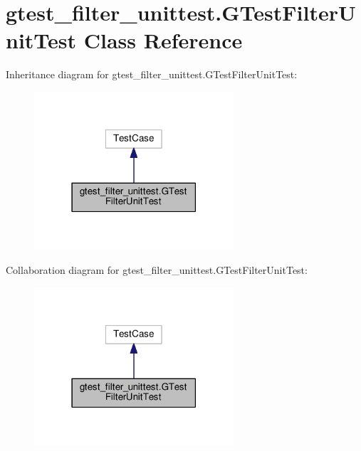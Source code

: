 \hypertarget{classgtest__filter__unittest_1_1GTestFilterUnitTest}{}\section{gtest\+\_\+filter\+\_\+unittest.\+G\+Test\+Filter\+Unit\+Test Class Reference}
\label{classgtest__filter__unittest_1_1GTestFilterUnitTest}


Inheritance diagram for gtest\+\_\+filter\+\_\+unittest.\+G\+Test\+Filter\+Unit\+Test\+:
\nopagebreak
\begin{figure}[H]
\begin{center}
\leavevmode
\includegraphics[width=210pt]{classgtest__filter__unittest_1_1GTestFilterUnitTest__inherit__graph}
\end{center}
\end{figure}


Collaboration diagram for gtest\+\_\+filter\+\_\+unittest.\+G\+Test\+Filter\+Unit\+Test\+:
\nopagebreak
\begin{figure}[H]
\begin{center}
\leavevmode
\includegraphics[width=210pt]{classgtest__filter__unittest_1_1GTestFilterUnitTest__coll__graph}
\end{center}
\end{figure}
